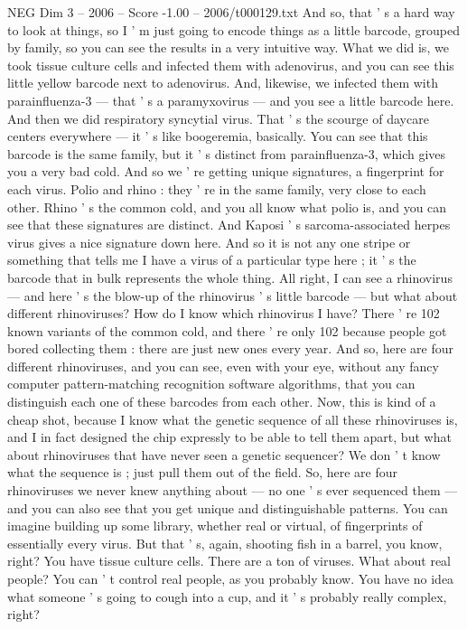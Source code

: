 \begin{textsample}{NEG Dim 3 – 2006 – Score -1.00 – 2006/t000129.txt}
And so, that ' s a hard way to look at things, so I ' m just going to encode things as a little barcode, grouped by family, so you can see the results in a very intuitive way.
What we did is, we took tissue culture cells and infected them with adenovirus, and you can see this little yellow barcode next to adenovirus.
And, likewise, we infected them with parainfluenza-3 — that ' s a paramyxovirus — and you see a little barcode here.
And then we did respiratory syncytial virus.
That ' s the scourge of daycare centers everywhere — it ' s like boogeremia, basically.
You can see that this barcode is the same family, but it ' s distinct from parainfluenza-3, which gives you a very bad cold.
And so we ' re getting unique signatures, a fingerprint for each virus.
Polio and rhino : they ' re in the same family, very close to each other.
Rhino ' s the common cold, and you all know what polio is, and you can see that these signatures are distinct.
And Kaposi ' s sarcoma-associated herpes virus gives a nice signature down here.
And so it is not any one stripe or something that tells me I have a virus of a particular type here ; it ' s the barcode that in bulk represents the whole thing.
All right, I can see a rhinovirus — and here ' s the blow-up of the rhinovirus ' s little barcode — but what about different rhinoviruses?
How do I know which rhinovirus I have?
There ' re 102 known variants of the common cold, and there ' re only 102 because people got bored collecting them : there are just new ones every year.
And so, here are four different rhinoviruses, and you can see, even with your eye, without any fancy computer pattern-matching recognition software algorithms, that you can distinguish each one of these barcodes from each other.
Now, this is kind of a cheap shot, because I know what the genetic sequence of all these rhinoviruses is, and I in fact designed the chip expressly to be able to tell them apart, but what about rhinoviruses that have never seen a genetic sequencer?
We don ' t know what the sequence is ; just pull them out of the field.
So, here are four rhinoviruses we never knew anything about — no one ' s ever sequenced them — and you can also see that you get unique and distinguishable patterns.
You can imagine building up some library, whether real or virtual, of fingerprints of essentially every virus.
But that ' s, again, shooting fish in a barrel, you know, right?
You have tissue culture cells.
There are a ton of viruses.
What about real people?
You can ' t control real people, as you probably know.
You have no idea what someone ' s going to cough into a cup, and it ' s probably really complex, right?

\end{textsample}
